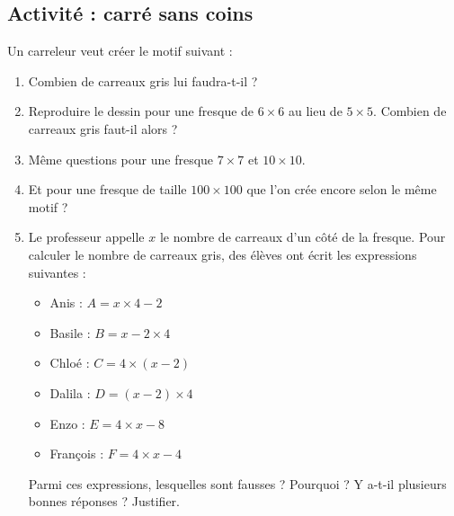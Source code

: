 
\subsection*{Activité : carré sans coins}

Un carreleur veut créer le motif suivant :
\begin{center}
   
\end{center}
\begin{enumerate}
    \item
Combien de carreaux gris lui faudra-t-il ? 
\item
Reproduire le dessin pour une fresque de \( 6\times 6\) au lieu de \( 5\times 5\). Combien de carreaux gris faut-il alors ? 
\item
    Même questions pour une fresque \( 7\times 7\) et \( 10\times 10\).
\item
Et pour une fresque de taille \( 100\times 100\) que l'on crée encore selon le même motif ?
\item
Le professeur appelle $x$ le nombre de carreaux d'un côté de la fresque. Pour calculer le nombre de carreaux gris, des élèves ont écrit les expressions suivantes :
\begin{multicols}{3}
    \begin{itemize}
        \item
            Anis : \( A=x\times 4-2\)
        \item
            Basile : \( B=x-2\times 4\)
        \item
            Chloé : \( C=4\times (x-2)\)
        \item
             Dalila : \( D=(x-2)\times 4 \)
         \item
             Enzo : \( E=4\times x-8\)
         \item
             François : \( F=4\times x-4\)
    \end{itemize}
\end{multicols}
Parmi ces expressions, lesquelles sont fausses ? Pourquoi ? Y a-t-il plusieurs bonnes réponses ? Justifier.
\end{enumerate}


